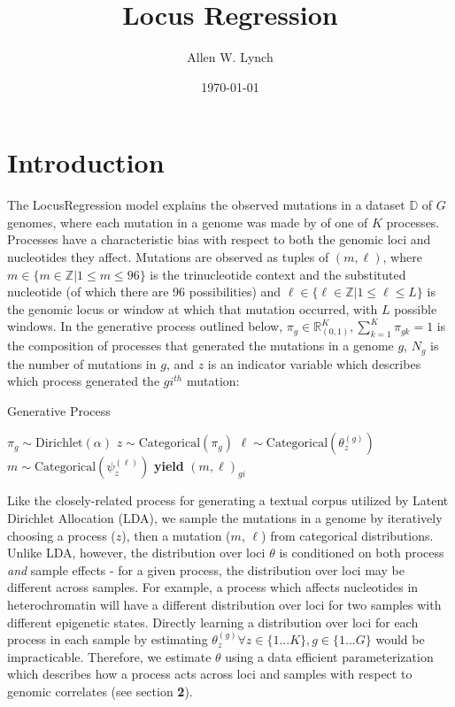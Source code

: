 \documentclass{article}
\author{Allen W. Lynch}
\title{Locus Regression}
\date{\today}
\begin{document}
\maketitle


\section{Introduction}

The LocusRegression model explains the observed mutations in a dataset $\mathbb{D}$ of $G$ genomes, where each mutation in a genome was made by of one 
of $K$ processes. Processes have a characteristic bias with respect to both the genomic loci and nucleotides they affect. 
Mutations are observed as tuples of $(m,\ell)$, where $m \in \{ m \in \mathbb{Z} | 1 \leq m \leq 96\}$ is the trinucleotide context and the substituted nucleotide (of which there are 96 possibilities)
and $\ell \in \{ \ell \in \mathbb{Z} | 1 \leq \ell \leq L \}$ is the genomic locus or window at which that mutation occurred, with $L$ possible windows. 
In the generative process outlined below, $\pi_g \in \mathbb{R}_{(0,1)}^K, \sum_{k=1}^K \pi_{gk} = 1$ is the composition of processes that generated the mutations in a genome $g$,
$N_g$ is the number of mutations in $g$, and $z$ is an indicator variable which describes which process generated the $gi^{th}$ mutation:

\begin{algorithm}
\caption{Generative Process}
\begin{algorithmic}
  \scriptsize
  	\STATE $ \pi_g \sim \textrm{Dirichlet}( \alpha ) $
  		\STATE $ z \sim \textrm{Categorical}( \pi_g ) $
  		\STATE $ \ell \sim \textrm{Categorical}( \theta^{(g)}_{z} ) $
  		\STATE $ m \sim \textrm{Categorical}( \psi^{(\ell)}_z ) $
  		\STATE \textbf{yield} $(m,\ell)_{gi}$
  	\ENDFOR
  \ENDFOR
\end{algorithmic}
\end{algorithm}

Like the closely-related process for generating a textual corpus utilized by Latent Dirichlet Allocation (LDA), we sample the mutations in a genome by
iteratively choosing a process ($z$), then a mutation ($m$, $\ell$) from categorical distributions. Unlike LDA, however, the distribution over loci $\theta$ 
is conditioned on both process \emph{and} sample effects - for a given process, the distribution over loci may be different across samples. For example, a process which
affects nucleotides in heterochromatin will have a different distribution over loci for two samples with different epigenetic states. Directly learning a distribution over loci for 
each process in each sample by estimating $\theta_z^{(g)}\forall z\in\{1...K\}, g \in \{1...G\}$ would be impracticable.
Therefore, we estimate $\theta$ using a data efficient parameterization which describes how a process acts across loci and samples with respect to genomic correlates (see section \textbf{2}).
\end{document}
